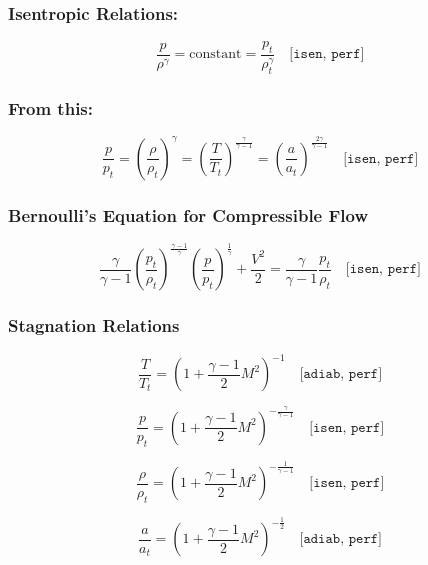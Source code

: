 \subsubsection*{Isentropic Relations:}

\begin{equation}
	\frac{p}{\rho^\gamma} = \text{constant} = \frac{p_t}{\rho_t^\gamma}
	\quad \texttt{[isen, perf]}
\end{equation}

\subsubsection*{From this:}

\begin{equation}
	\frac{p}{p_t} = \left( \frac{\rho}{\rho_t} \right)^\gamma = \left( \frac{T}{T_t} \right)^{\frac{\gamma}{\gamma - 1}} = \left( \frac{a}{a_t} \right)^{\frac{2\gamma}{\gamma - 1}}
	\quad \texttt{[isen, perf]}
\end{equation}

\subsubsection*{Bernoulli's Equation for Compressible Flow}

\begin{equation}
	\frac{\gamma}{\gamma - 1} \left( \frac{p_t}{\rho_t} \right)^{\frac{\gamma - 1}{\gamma}} \left( \frac{p}{p_t} \right)^{\frac{1}{\gamma}} + \frac{V^2}{2} = \frac{\gamma}{\gamma - 1} \frac{p_t}{\rho_t} 
	\quad \texttt{[isen, perf]}
\end{equation}

\subsubsection*{Stagnation Relations}

\begin{equation}
	\frac{T}{T_t} = \left( 1 + \frac{\gamma - 1}{2} M^2 \right)^{-1}
	\quad \texttt{[adiab, perf]}
	\label{eq:total_relation_T}
\end{equation}

\begin{equation}
	\frac{p}{p_t} = \left( 1 + \frac{\gamma - 1}{2} M^2 \right)^{-\frac{\gamma}{\gamma - 1}}
	\quad \texttt{[isen, perf]}
	\label{eq:total_relation_p}
\end{equation}

\begin{equation}
	\frac{\rho}{\rho_t} = \left( 1 + \frac{\gamma - 1}{2} M^2 \right)^{-\frac{1}{\gamma - 1}}
	\quad \texttt{[isen, perf]}
	\label{eq:total_relation_rho}
\end{equation}

\begin{equation}
	\frac{a}{a_t} = \left( 1 + \frac{\gamma - 1}{2} M^2 \right)^{-\frac{1}{2}}
	\quad \texttt{[adiab, perf]}
\end{equation}

\blankpage
